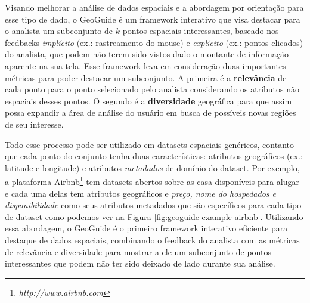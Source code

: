 Visando melhorar a análise de dados espaciais e a abordagem por orientação para esse tipo de dado, o GeoGuide \cite{omidvarTehrani2017} é um framework interativo que visa destacar para o analista um subconjunto de $k$ pontos espaciais interessantes, baseado nos feedbacks \textit{implícito} (ex.: rastreamento do mouse) e \textit{explícito} (ex.: pontos clicados) do analista, que podem não terem sido vistos dado o montante de informação aparente na sua tela. Esse framework leva em consideração duas importantes métricas para poder destacar um subconjunto. A primeira é a \textbf{relevância} de cada ponto para o ponto selecionado pelo analista considerando os atributos não espaciais desses pontos. O segundo é a \textbf{diversidade} geográfica para que assim possa expandir a área de análise do usuário em busca de possíveis novas regiões de seu interesse.


Todo esse processo pode ser utilizado em datasets espaciais genéricos, contanto que cada ponto do conjunto tenha duas características: atributos geográficos (ex.: latitude e longitude) e atributos \textit{metadados} de domínio do dataset. Por exemplo, a plataforma Airbnb\footnote{\it http://www.airbnb.com} tem datasets abertos sobre as casa disponíveis para alugar e cada uma delas tem atributos geográficos e \textit{preço, nome do hospedados e disponibilidade} como seus atributos metadados que são específicos para cada tipo de dataset como podemos ver na Figura \ref{fig:geoguide-example-airbnb}. Utilizando essa abordagem, o GeoGuide é o primeiro framework interativo eficiente para destaque de dados espaciais, combinando o feedback do analista com as métricas de relevância e diversidade para mostrar a ele um subconjunto de pontos interessantes que podem não ter sido deixado de lado durante sua análise.

